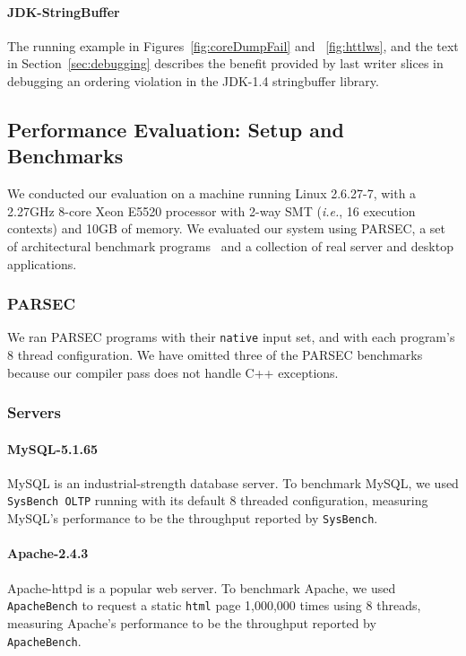 \documentclass[preprint,9pt]{sigplanconf}
\begin{document}
\paragraph{JDK-StringBuffer}

The running example in Figures~\ref{fig:coreDumpFail} and ~\ref{fig:httlws},
and the text in Section~\ref{sec:debugging} describes the benefit provided by
last writer slices in debugging an ordering violation in the JDK-1.4 stringbuffer library.  



\subsection{Performance Evaluation: Setup and Benchmarks}

We conducted our evaluation on a machine running Linux 2.6.27-7, with a 2.27GHz
8-core Xeon E5520 processor with 2-way SMT ({\em i.e.}, 16 execution contexts)
and 10GB of memory.  We evaluated our system using PARSEC, a set of
architectural benchmark programs~\cite{parsec} and a collection of real server
and desktop applications.    

\subsubsection{PARSEC}

We ran PARSEC programs with their {\tt native} input set, and with each
program's 8 thread configuration. We have omitted three of the PARSEC
benchmarks because our compiler pass does not handle C++ exceptions.    

\subsubsection{Servers}


\paragraph{MySQL-5.1.65} MySQL is an industrial-strength database
server. To benchmark MySQL, we used {\tt SysBench OLTP} running with its
default 8 threaded configuration, measuring MySQL's performance to be the
throughput reported by {\tt SysBench}.  

\paragraph{Apache-2.4.3} 
Apache-httpd is a popular web server.  To benchmark Apache, we used {\tt
ApacheBench} to request a static {\tt html} page 1,000,000 times using 8
threads, measuring Apache's performance to be the throughput reported by {\tt
ApacheBench}.  
\end{document}
